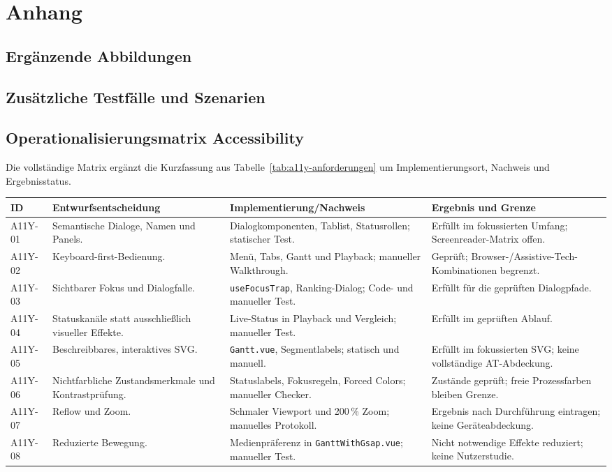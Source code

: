 \appendix

\chapter{Anhang}

\section{Ergänzende Abbildungen}

\section{Zusätzliche Testfälle und Szenarien}

\section{Operationalisierungsmatrix Accessibility}

Die vollständige Matrix ergänzt die Kurzfassung aus Tabelle~\ref{tab:a11y-anforderungen} um Implementierungsort, Nachweis und Ergebnisstatus.

\begin{table}[H]
\centering
\small
\begin{tabular}{p{}p{}p{}p{}}
\textbf{ID} & \textbf{Entwurfsentscheidung} & \textbf{Implementierung/Nachweis} & \textbf{Ergebnis und Grenze} \\
\hline
A11Y-01 & Semantische Dialoge, Namen und Panels. & Dialogkomponenten, Tablist, Statusrollen; statischer Test. & Erfüllt im fokussierten Umfang; Screenreader-Matrix offen. \\
A11Y-02 & Keyboard-first-Bedienung. & Menü, Tabs, Gantt und Playback; manueller Walkthrough. & Geprüft; Browser-/Assistive-Tech-Kombinationen begrenzt. \\
A11Y-03 & Sichtbarer Fokus und Dialogfalle. & \texttt{useFocusTrap}, Ranking-Dialog; Code- und manueller Test. & Erfüllt für die geprüften Dialogpfade. \\
A11Y-04 & Statuskanäle statt ausschließlich visueller Effekte. & Live-Status in Playback und Vergleich; manueller Test. & Erfüllt im geprüften Ablauf. \\
A11Y-05 & Beschreibbares, interaktives SVG. & \texttt{Gantt.vue}, Segmentlabels; statisch und manuell. & Erfüllt im fokussierten SVG; keine vollständige AT-Abdeckung. \\
A11Y-06 & Nichtfarbliche Zustandsmerkmale und Kontrastprüfung. & Statuslabels, Fokusregeln, Forced Colors; manueller Checker. & Zustände geprüft; freie Prozessfarben bleiben Grenze. \\
A11Y-07 & Reflow und Zoom. & Schmaler Viewport und 200\,\% Zoom; manuelles Protokoll. & Ergebnis nach Durchführung eintragen; keine Geräteabdeckung. \\
A11Y-08 & Reduzierte Bewegung. & Medienpräferenz in \texttt{GanttWithGsap.vue}; manueller Test. & Nicht notwendige Effekte reduziert; keine Nutzerstudie. \\
\end{tabular}
\end{table}

